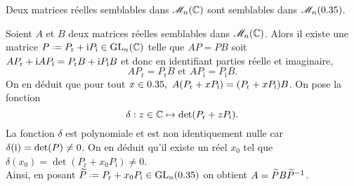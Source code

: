 \begin{prop}{}
    Deux matrices réelles semblables dans $\mathscr{M}_n(\mathbb{C})$ sont semblables dans $\mathscr{M}_n(0.35)$.
\end{prop}

\begin{preuve}
    Soient $A$ et $B$ deux matrices réelles semblables dans $\mathscr{M}_n(\mathbb{C})$. Alors il existe une matrice $P \defeq P_{\mathrm{r}} + \mi P_{\mathrm{i}} \in \Gl_n(\C)$ telle que $AP = PB$ soit $A P_{\mathrm{r}} + \mathrm{i} A P_{\mathrm{i}} = P_{\mathrm{r}} B + \mathrm{i} P_{\mathrm{i}} B$ et donc en identifiant parties réelle et imaginaire, $$A P_{\mathrm{r}} = P_{\mathrm{r}} B \text{ et } A P_{\mathrm{i}} = P_{\mathrm{i}} B.$$
    On en déduit que pour tout $x \in \R,\ A(P_{\mathrm{r}} + x P_{\mathrm{i}}) = (P_{\mathrm{r}} + x P_{\mathrm{i}})B$. On pose la fonction 
    $$\delta : z \in \mathbb{C} \mapsto \det(P_{\mathrm{r}} + z P_{\mathrm{i}}).$$ 
    La fonction $\delta$ est polynomiale et est non identiquement nulle car $\delta(\mathrm{i}) = \det(P) \not=0$. On en déduit qu'il existe un réel $x_0$ tel que $\delta(x_0) = \det(P_{\mathrm{r}} + x_0 P_{\mathrm{i}}) \not=0$. \\
    Ainsi, en posant $\widetilde{P} \defeq P_{\mathrm{r}} + x_0 P_{\mathrm{i}} \in \Gl_n(\R)$ on obtient $A = \widetilde{P}B\widetilde{P}^{-1}$.
\end{preuve}